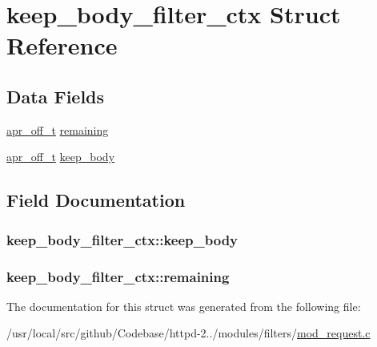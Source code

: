 \hypertarget{structkeep__body__filter__ctx}{}\section{keep\+\_\+body\+\_\+filter\+\_\+ctx Struct Reference}
\label{structkeep__body__filter__ctx}
\subsection*{Data Fields}
\begin{DoxyCompactItemize}
\item 
\hyperlink{group__apr__platform_ga6938af9075cec15c88299109381aa984}{apr\+\_\+off\+\_\+t} \hyperlink{structkeep__body__filter__ctx_a973ea1ffa504c1aa1c46f5f723f3297e}{remaining}
\item 
\hyperlink{group__apr__platform_ga6938af9075cec15c88299109381aa984}{apr\+\_\+off\+\_\+t} \hyperlink{structkeep__body__filter__ctx_a914a75ad70bde8c2a8f832faefaa2b07}{keep\+\_\+body}
\end{DoxyCompactItemize}


\subsection{Field Documentation}
\subsubsection[{\texorpdfstring{keep\+\_\+body}{keep_body}}]{ keep\+\_\+body\+\_\+filter\+\_\+ctx\+::keep\+\_\+body}\hypertarget{structkeep__body__filter__ctx_a914a75ad70bde8c2a8f832faefaa2b07}{}\label{structkeep__body__filter__ctx_a914a75ad70bde8c2a8f832faefaa2b07}
\subsubsection[{\texorpdfstring{remaining}{remaining}}]{ keep\+\_\+body\+\_\+filter\+\_\+ctx\+::remaining}\hypertarget{structkeep__body__filter__ctx_a973ea1ffa504c1aa1c46f5f723f3297e}{}\label{structkeep__body__filter__ctx_a973ea1ffa504c1aa1c46f5f723f3297e}


The documentation for this struct was generated from the following file\+:\begin{DoxyCompactItemize}
\item 
/usr/local/src/github/\+Codebase/httpd-\/2../modules/filters/\hyperlink{mod__request_8c}{mod\+\_\+request.\+c}\end{DoxyCompactItemize}
